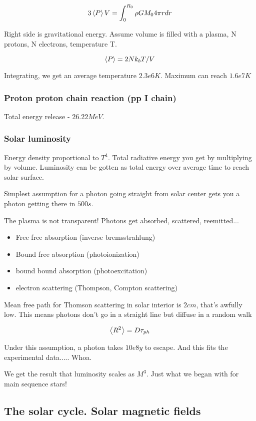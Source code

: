 \documentclass[PlasmaNotes.tex]{subfiles}
\begin{document}
\[3 \left< P \right> V = \int_0^{R_0}{\rho G M_0 4 \pi r dr} \]

Right side is gravitational energy. Assume volume is filled with a plasma, N protons, N electrons, temperature T.

\[ \left< P \right> = 2 N k_b T/V \]

Integrating, we get an average temperature $2.3e6 K$. Maximum can reach $1.6e7 K$

\subsubsection{Proton proton chain reaction (pp I chain)}

Total energy release - $26.22 MeV$.

\subsubsection{Solar luminosity}

Energy density proportional to $T^4$. Total radiative energy you get by multiplying by volume. Luminosity can be gotten as total energy over average time to reach solar surface.

Simplest assumption for a photon going straight from solar center gets you a photon getting there in $500s$.

The plasma is not transparent! Photons get absorbed, scattered, reemitted...

\begin{itemize}
\item Free free absorption (inverse bremsstrahlung)
\item Bound free absorption (photoionization)
\item bound bound absorption (photoexcitation)
\item electron scattering (Thompson, Compton scattering)
\end{itemize}

Mean free path for Thomson scattering in solar interior is $2 cm$, that's awfully low. This means photons don't go in a straight line but diffuse in a random walk

\[ \left< R^2 \right> = D \tau_{ph} \]

Under this assumption, a photon takes $10e8 y$ to escape. And this fits the experimental data..... Whoa.

We get the result that luminosity scales as $M^3$. Just what we began with for main sequence stars!


\subsection{The solar cycle. Solar magnetic fields}
\end{document}
